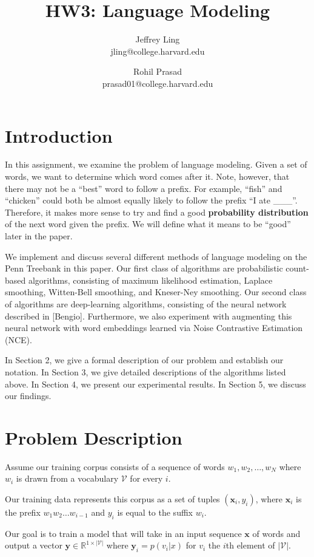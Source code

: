 \documentclass[11pt]{article}
\title{HW3: Language Modeling}
\author{Jeffrey Ling \\ jling@college.harvard.edu \and Rohil Prasad \\ prasad01@college.harvard.edu }
\begin{document}
\maketitle{}
\section{Introduction}

In this assignment, we examine the problem of language modeling. Given a set of words, we want to determine which word comes after it. Note, however, that there may not be a ``best'' word to follow a prefix. For example, ``fish'' and ``chicken'' could both be almost equally likely to follow the prefix ``I ate \_\_\_''. Therefore, it makes more sense to try and find a good \textbf{probability distribution} of the next word given the prefix. We will define what it means to be ``good'' later in the paper. 

We implement and discuss several different methods of language modeling on the Penn Treebank in this paper. Our first class of algorithms are probabilistic count-based algorithms, consisting of maximum likelihood estimation, Laplace smoothing, Witten-Bell smoothing, and Kneser-Ney smoothing. Our second class of algorithms are deep-learning algorithms, consisting of the neural network described in [Bengio]. Furthermore, we also experiment with augmenting this neural network with word embeddings learned via Noise Contrastive Estimation (NCE). 

In Section 2, we give a formal description of our problem and establish our notation. In Section 3, we give detailed descriptions of the algorithms listed above. In Section 4, we present our experimental results. In Section 5, we discuss our findings. 

\section{Problem Description}

Assume our training corpus consists of a sequence of words $w_1, w_2, \dots, w_N$ where $w_i$ is drawn from a vocabulary $\mathcal{V}$ for every $i$. 

Our training data represents this corpus as a set of tuples $(\mathbf{x}_i, y_i)$, where $\mathbf{x}_i$ is the prefix $w_1w_2\dots w_{i-1}$ and $y_i$ is equal to the suffix $w_i$. 

Our goal is to train a model that will take in an input sequence $\mathbf{x}$ of words and output a vector $\mathbf{y} \in \mathbb{R}^{1 \times |\mathcal{V}|}$ where $\mathbf{y}_i = p(v_i | x)$ for $v_i$ the $i$th element of $|\mathcal{V}|$.
\end{document}
